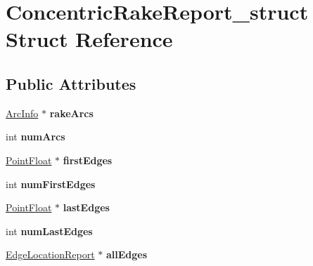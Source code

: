 \hypertarget{structConcentricRakeReport__struct}{\section{\-Concentric\-Rake\-Report\-\_\-struct \-Struct \-Reference}
\label{structConcentricRakeReport__struct}
}
\subsection*{\-Public \-Attributes}
\begin{DoxyCompactItemize}
\item 
\hypertarget{structConcentricRakeReport__struct_a723f997fe56b7a93acddb00c3aa9311a}{\hyperlink{structArcInfo__struct}{\-Arc\-Info} $\ast$ {\bfseries rake\-Arcs}}\label{structConcentricRakeReport__struct_a723f997fe56b7a93acddb00c3aa9311a}

\item 
\hypertarget{structConcentricRakeReport__struct_a979134629fda4c2fb0860b474d77695d}{int {\bfseries num\-Arcs}}\label{structConcentricRakeReport__struct_a979134629fda4c2fb0860b474d77695d}

\item 
\hypertarget{structConcentricRakeReport__struct_a3e64201cb06021e427ec27f90215449e}{\hyperlink{structPointFloat__struct}{\-Point\-Float} $\ast$ {\bfseries first\-Edges}}\label{structConcentricRakeReport__struct_a3e64201cb06021e427ec27f90215449e}

\item 
\hypertarget{structConcentricRakeReport__struct_abf8847c8d254aec4a667ff4f3ee1959d}{int {\bfseries num\-First\-Edges}}\label{structConcentricRakeReport__struct_abf8847c8d254aec4a667ff4f3ee1959d}

\item 
\hypertarget{structConcentricRakeReport__struct_ac3497d3011f06a69ecc01960accd6960}{\hyperlink{structPointFloat__struct}{\-Point\-Float} $\ast$ {\bfseries last\-Edges}}\label{structConcentricRakeReport__struct_ac3497d3011f06a69ecc01960accd6960}

\item 
\hypertarget{structConcentricRakeReport__struct_a3974e299682213de2f2af869a56f9283}{int {\bfseries num\-Last\-Edges}}\label{structConcentricRakeReport__struct_a3974e299682213de2f2af869a56f9283}

\item 
\hypertarget{structConcentricRakeReport__struct_a2aa4d28db561c961a4f4833878937659}{\hyperlink{structEdgeLocationReport__struct}{\-Edge\-Location\-Report} $\ast$ {\bfseries all\-Edges}}\label{structConcentricRakeReport__struct_a2aa4d28db561c961a4f4833878937659}


\end{DoxyCompactItemize}
